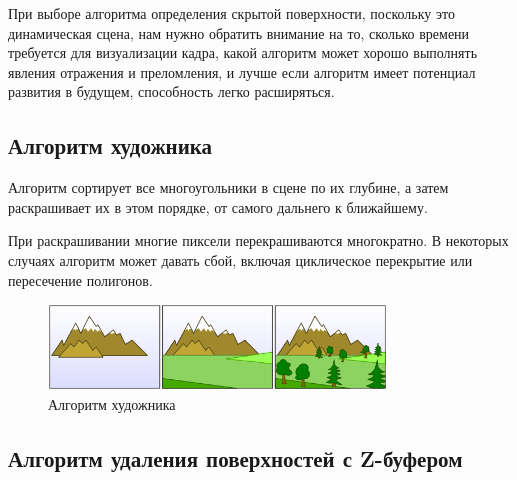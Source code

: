 При выборе алгоритма определения скрытой поверхности, поскольку это динамическая сцена, нам нужно обратить внимание на то, сколько времени требуется для визуализации кадра, какой алгоритм может хорошо выполнять явления отражения и преломления, и лучше если алгоритм имеет потенциал развития в будущем, способность легко расширяться.



\subsection*{Алгоритм художника}

Алгоритм сортирует все многоугольники в сцене по их глубине, а затем раскрашивает их в этом порядке, от самого дальнего к ближайшему.

При раскрашивании многие пиксели перекрашиваются многократно.
В некоторых случаях алгоритм может давать сбой, включая циклическое перекрытие или пересечение полигонов.
\\
\begin{figure}[ht]
  \centering
  \includegraphics[width=0.8\textwidth]{img/painter.png}
  \caption{Алгоритм художника}
\end{figure}


\subsection*{Алгоритм удаления поверхностей с Z-буфером}


